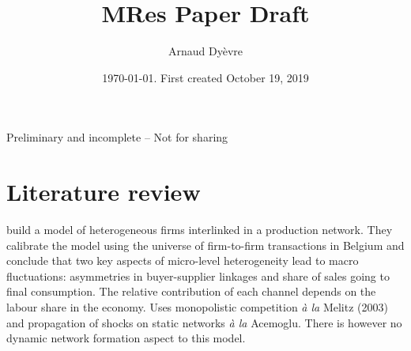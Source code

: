 \documentclass{amsart}
\theoremstyle{definition}
\theoremstyle{remark}
\numberwithin{equation}{section}
\begin{document}
\title{MRes Paper Draft}

\author{Arnaud Dy\`evre}



\date{\today. First created October 19, 2019}




\maketitle

\begin{center}
     Preliminary and incomplete -- Not for sharing
\end{center}


\vspace{12pt}



\tableofcontents

\newpage

\section{Literature review}

\cite{magerman2016heterogeneous} build a model of heterogeneous firms interlinked in a production network. They calibrate the model using the universe of firm-to-firm transactions in Belgium and conclude that two key aspects of micro-level heterogeneity lead to macro fluctuations: asymmetries in buyer-supplier linkages and share of sales going to final consumption. The relative contribution of each channel depends on the labour share in the economy. Uses monopolistic competition \textit{à la} Melitz (2003) and propagation of shocks on static networks \textit{à la} Acemoglu. There is however no dynamic network formation aspect to this model. \\
\end{document}
